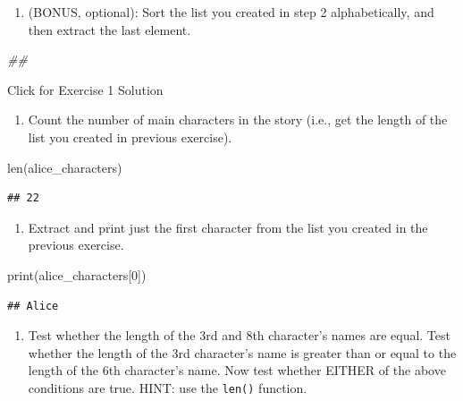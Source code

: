 \documentclass[]{book}
\newenvironment{Shaded}{\begin{snugshade}}{\end{snugshade}}
\newcommand{\BuiltInTok}[1]{#1}
\newcommand{\CommentTok}[1]{\textcolor[rgb]{0.56,0.35,0.01}{\textit{#1}}}
\newcommand{\DecValTok}[1]{\textcolor[rgb]{0.00,0.00,0.81}{#1}}
\newcommand{\NormalTok}[1]{#1}
\providecommand{\tightlist}{%
  \setlength{\itemsep}{0pt}\setlength{\parskip}{0pt}}
\begin{document}
\begin{enumerate}
\def\labelenumi{\arabic{enumi}.}
\setcounter{enumi}{3}
\tightlist
\item
  (BONUS, optional): Sort the list you created in step 2 alphabetically,
  and then extract the last element.
\end{enumerate}

\begin{Shaded}
\begin{Highlighting}[]
\CommentTok{##}
\end{Highlighting}
\end{Shaded}

{Click for Exercise 1 Solution}

\begin{enumerate}
\def\labelenumi{\arabic{enumi}.}
\tightlist
\item
  Count the number of main characters in the story (i.e., get the length of the list you created in previous exercise).
\end{enumerate}

\begin{Shaded}
\begin{Highlighting}[]
\BuiltInTok{len}\NormalTok{(alice_characters)}
\end{Highlighting}
\end{Shaded}

\begin{verbatim}
## 22
\end{verbatim}

\begin{enumerate}
\def\labelenumi{\arabic{enumi}.}
\setcounter{enumi}{1}
\tightlist
\item
  Extract and print just the first character from the list you created in the previous exercise.
\end{enumerate}

\begin{Shaded}
\begin{Highlighting}[]
\BuiltInTok{print}\NormalTok{(alice_characters[}\DecValTok{0}\NormalTok{])}
\end{Highlighting}
\end{Shaded}

\begin{verbatim}
## Alice
\end{verbatim}

\begin{enumerate}
\def\labelenumi{\arabic{enumi}.}
\setcounter{enumi}{2}
\tightlist
\item
  Test whether the length of the 3rd and 8th character's names are equal. Test whether the length of
  the 3rd character's name is greater than or equal to the length of the 6th character's name. Now test
  whether EITHER of the above conditions are true. HINT: use the \texttt{len()} function.
\end{enumerate}
\end{document}
